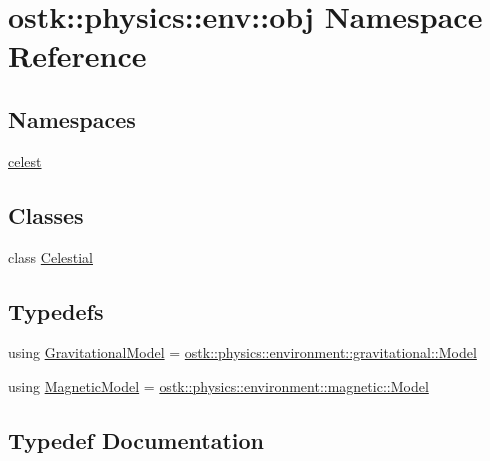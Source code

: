 \hypertarget{namespaceostk_1_1physics_1_1env_1_1obj}{}\section{ostk\+:\+:physics\+:\+:env\+:\+:obj Namespace Reference}
\label{namespaceostk_1_1physics_1_1env_1_1obj}
\subsection*{Namespaces}
\begin{DoxyCompactItemize}
\item 
 \hyperlink{namespaceostk_1_1physics_1_1env_1_1obj_1_1celest}{celest}
\end{DoxyCompactItemize}
\subsection*{Classes}
\begin{DoxyCompactItemize}
\item 
class \hyperlink{classostk_1_1physics_1_1env_1_1obj_1_1_celestial}{Celestial}
\end{DoxyCompactItemize}
\subsection*{Typedefs}
\begin{DoxyCompactItemize}
\item 
using \hyperlink{namespaceostk_1_1physics_1_1env_1_1obj_a50c0bc72e8880f2fa2a910a81e050c97}{Gravitational\+Model} = \hyperlink{classostk_1_1physics_1_1environment_1_1gravitational_1_1_model}{ostk\+::physics\+::environment\+::gravitational\+::\+Model}
\item 
using \hyperlink{namespaceostk_1_1physics_1_1env_1_1obj_a11552c1290e2f6b4693ea00c2df2c80d}{Magnetic\+Model} = \hyperlink{classostk_1_1physics_1_1environment_1_1magnetic_1_1_model}{ostk\+::physics\+::environment\+::magnetic\+::\+Model}
\end{DoxyCompactItemize}


\subsection{Typedef Documentation}
\mbox{\label{namespaceostk_1_1physics_1_1env_1_1obj_a50c0bc72e8880f2fa2a910a81e050c97}} 
